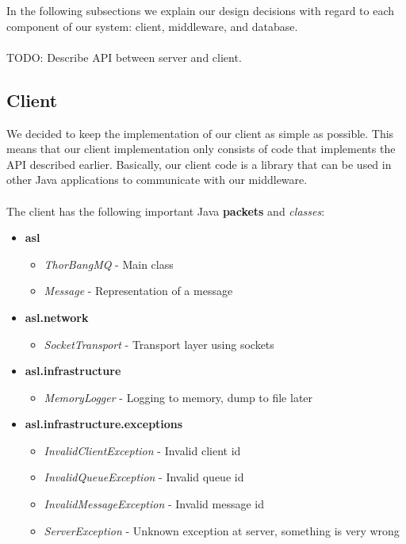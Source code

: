 \documentclass{article}
\begin{document}
        \noindent In the following subsections we explain our design decisions with regard to each component of our system: client, middleware, and database.\\
        \\
        TODO: Describe API between server and client.


        \subsection{Client}
            We decided to keep the implementation of our client as simple as possible. This means that our client implementation only consists of code that implements the API described earlier. Basically, our client code is a library that can be used in other Java applications to communicate with our middleware.\\
            \\
            The client has the following important Java \textbf{packets} and \textit{classes}:
            \begin{itemize}
                \item \textbf{asl}
                    \begin{itemize}
                        \item \textit{ThorBangMQ} - Main class
                        \item \textit{Message} - Representation of a message
                    \end{itemize}
                \item \textbf{asl.network}
                \begin{itemize}
                     \item \textit{SocketTransport} - Transport layer using sockets
                 \end{itemize} 
                \item \textbf{asl.infrastructure}
                 \begin{itemize}
                    \item \textit{MemoryLogger} - Logging to memory, dump to file later
                \end{itemize}
                \item \textbf{asl.infrastructure.exceptions}
                \begin{itemize}
                    \item \textit{InvalidClientException} - Invalid client id
                    \item \textit{InvalidQueueException} - Invalid queue id
                    \item \textit{InvalidMessageException} - Invalid message id
                    \item \textit{ServerException} - Unknown exception at server, something is very wrong
                \end{itemize}
            \end{itemize}
\end{document}
